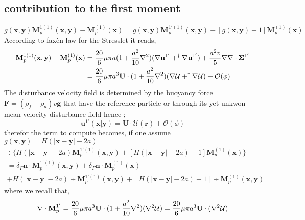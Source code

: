 \documentclass[12pt]{My_preprint}
\begin{document}
\subsection*{contribution to the first moment }
\begin{equation}
    g(\textbf{x},\textbf{y})\textbf{M}_{p}^{1(1)}(\textbf{x},\textbf{y}) - \textbf{M}_{p}^{(1)}(\textbf{x})
    =
    g(\textbf{x},\textbf{y})\textbf{M}_{p}^{1'(1)}(\textbf{x},\textbf{y}) 
    + [g(\textbf{x},\textbf{y})-1]\textbf{M}_{p}^{(1)}(\textbf{x})
\end{equation}
According to faxèn law for the Stresslet it reads, 
\begin{align}
    \textbf{M}_{p}^{1(1)}(\textbf{x},\textbf{y})
    - \textbf{M}_{p}^{(1)}(\textbf{x})
    &=
    \frac{20}{6}\mu\pi a (1 + \frac{a^2}{10}\mathbf{\nabla}^2)(\mathbf{\nabla} \textbf{u}^{1'}  + ^\dagger\mathbf{\nabla} \textbf{u}^{1'})
    + \frac{a^2 v}{5} \mathbf{\nabla}\mathbf{\nabla}\cdot \bm\Sigma^{1'}\\
    &=
    \frac{20}{6}\mu\pi a^3 \textbf{U}\cdot(1 + \frac{a^2}{10}\mathbf{\nabla}^2)(\mathbf{\nabla} \mathcal{U}  + ^\dagger\mathbf{\nabla} \mathcal{U})
    +\mathcal{O}(\phi)
\end{align}
The disturbance velocity field is determined by the buoyancy force $\textbf{F} = (\rho_f - \rho_d)v \textbf{g} $ that have the reference particle or through its yet unkwon mean velocity disturbance field hence ; 
\begin{equation}
    \textbf{u}^{1'} (\textbf{x}|\textbf{y})
    =
    \textbf{U}\cdot \mathcal{U}(\textbf{r})
    + 
    \mathcal{O}(\phi)
\end{equation}
therefor the term to compute becomes, if one assume $g(\textbf{x},\textbf{y}) =  H(|\textbf{x}- \textbf{y}|-2a)$ 
\begin{multline}
    \div 
    \{H(|\textbf{x}-\textbf{y}|-2a)\textbf{M}_{p}^{1'(1)}(\textbf{x},\textbf{y}) 
    + [H(|\textbf{x}-\textbf{y}|-2a)-1]\textbf{M}_{p}^{(1)}(\textbf{x})\}\\
    =
    \delta_\Gamma \textbf{n}\cdot \textbf{M}_{p}^{1'(1)}(\textbf{x},\textbf{y})
    + \delta_\Gamma \textbf{n}\cdot \textbf{M}_{p}^{(1)}(\textbf{x})\\
    + H(|\textbf{x}- \textbf{y}|-2a ) \div \textbf{M}_{p}^{1'(1)}(\textbf{x},\textbf{y}) 
    + [H(|\textbf{x}- \textbf{y}|-2a )-1] \div \textbf{M}_{p}^{(1)}(\textbf{x},\textbf{y}) 
\end{multline}
where we recall that, 
\begin{equation}
    \mathbf{\nabla}\cdot\textbf{M}_p^{1'}
    =
    \frac{20}{6}\mu\pi a^3 \textbf{U}\cdot (1+\frac{a^2}{10}\mathbf{\nabla}^2)(\mathbf{\nabla}^2 \mathcal{U})
    =
    \frac{20}{6}\mu\pi a^3 \textbf{U}\cdot (\mathbf{\nabla}^2 \mathcal{U})
\end{equation}
\end{document}
